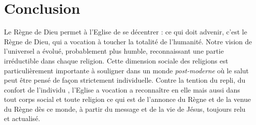 \section{Conclusion}    

Le Règne de Dieu permet à l'Eglise de se décentrer : ce qui doit advenir, c'est le Règne de Dieu, qui a vocation à toucher la totalité de l'humanité. Notre vision de l'universel a évolué, probablement plus humble, reconnaissant une partie irréductible dans chaque religion. 
Cette dimension sociale des religions est particulièrement importante à souligner dans un monde \textit{post-moderne} où le salut peut être pensé de façon strictement individuelle. Contre la tention du repli, du confort de l'individu \cite[p.107]{Pannenberg:RoyaumeDieu}, l'Eglise a vocation a reconnaître en elle mais aussi dans tout corps social et toute religion ce qui est de l'annonce du Règne et de la venue du Règne dès ce monde, à partir du message et de la vie de Jésus, toujours relu et actualisé. 


